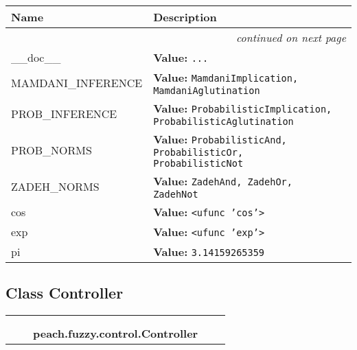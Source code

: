 \begin{longtable}{|p{}|p{}|l}
\cline{1-2}
\cline{1-2} \centering \textbf{Name} & \centering \textbf{Description}& \\
\cline{1-2}
\endhead\cline{1-2}\multicolumn{3}{r}{\small\textit{continued on next page}}\\\endfoot\cline{1-2}
\endlastfoot\raggedright \_\-\_\-d\-o\-c\-\_\-\_\- & \raggedright \textbf{Value:} 
{\tt \texttt{...}}&\\
\cline{1-2}
\raggedright M\-A\-M\-D\-A\-N\-I\-\_\-I\-N\-F\-E\-R\-E\-N\-C\-E\- & \raggedright \textbf{Value:} 
{\tt MamdaniImplication, MamdaniAglutination}&\\
\cline{1-2}
\raggedright P\-R\-O\-B\-\_\-I\-N\-F\-E\-R\-E\-N\-C\-E\- & \raggedright \textbf{Value:} 
{\tt ProbabilisticImplication, ProbabilisticAglutination}&\\
\cline{1-2}
\raggedright P\-R\-O\-B\-\_\-N\-O\-R\-M\-S\- & \raggedright \textbf{Value:} 
{\tt ProbabilisticAnd, ProbabilisticOr, ProbabilisticNot}&\\
\cline{1-2}
\raggedright Z\-A\-D\-E\-H\-\_\-N\-O\-R\-M\-S\- & \raggedright \textbf{Value:} 
{\tt ZadehAnd, ZadehOr, ZadehNot}&\\
\cline{1-2}
\raggedright c\-o\-s\- & \raggedright \textbf{Value:} 
{\tt {\textless}ufunc 'cos'{\textgreater}}&\\
\cline{1-2}
\raggedright e\-x\-p\- & \raggedright \textbf{Value:} 
{\tt {\textless}ufunc 'exp'{\textgreater}}&\\
\cline{1-2}
\raggedright p\-i\- & \raggedright \textbf{Value:} 
{\tt 3.14159265359}&\\
\cline{1-2}
\end{longtable}



\subsection{Class Controller}

    \label{peach:fuzzy:control:Controller}
\begin{tabular}{cccccc}
\multicolumn{2}{r}{\settowidth{\BCL}{object}\multirow{2}{\BCL}{object}}
&&
  \\\cline{3-3}
  &&\multicolumn{1}{c|}{}
&&
  \\
&&\multicolumn{2}{l}{\textbf{peach.fuzzy.control.Controller}}
\end{tabular}

